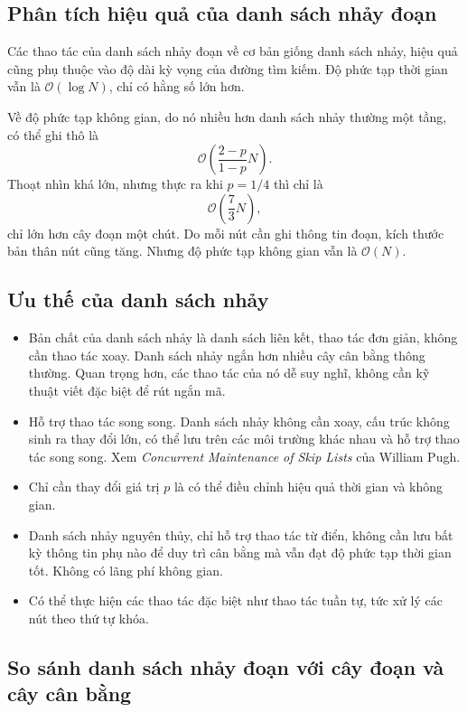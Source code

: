 \documentclass[11pt]{article}
\newcommand{\Oh}{\mathcal{O}}
\begin{document}
\subsection{Phân tích hiệu quả của danh sách nhảy đoạn}

Các thao tác của danh sách nhảy đoạn về cơ bản giống danh sách nhảy, hiệu quả
cũng phụ thuộc vào độ dài kỳ vọng của đường tìm kiếm. Độ phức tạp thời gian
vẫn là $\Oh(\log N)$, chỉ có hằng số lớn hơn.

Về độ phức tạp không gian, do nó nhiều hơn danh sách nhảy thường một tầng, có
thể ghi thô là
\[
  \Oh\!\left(\frac{2-p}{1-p}N\right).
\]
Thoạt nhìn khá lớn, nhưng thực ra khi $p=1/4$ thì chỉ là
\[
  \Oh\!\left(\frac{7}{3}N\right),
\]
chỉ lớn hơn cây đoạn một chút. Do mỗi nút cần ghi thông tin đoạn, kích thước
bản thân nút cũng tăng. Nhưng độ phức tạp không gian vẫn là $\Oh(N)$.

\subsection{Ưu thế của danh sách nhảy}

\begin{itemize}
  \item Bản chất của danh sách nhảy là danh sách liên kết, thao tác đơn giản,
  không cần thao tác xoay. Danh sách nhảy ngắn hơn nhiều cây cân bằng thông
  thường. Quan trọng hơn, các thao tác của nó dễ suy nghĩ, không cần kỹ thuật
  viết đặc biệt để rút ngắn mã.

  \item Hỗ trợ thao tác song song. Danh sách nhảy không cần xoay, cấu trúc
  không sinh ra thay đổi lớn, có thể lưu trên các môi trường khác nhau và hỗ
  trợ thao tác song song. Xem \textit{Concurrent Maintenance of Skip Lists}
  của William Pugh.

  \item Chỉ cần thay đổi giá trị $p$ là có thể điều chỉnh hiệu quả thời gian
  và không gian.

  \item Danh sách nhảy nguyên thủy, chỉ hỗ trợ thao tác từ điển, không cần lưu
  bất kỳ thông tin phụ nào để duy trì cân bằng mà vẫn đạt độ phức tạp thời
  gian tốt. Không có lãng phí không gian.

  \item Có thể thực hiện các thao tác đặc biệt như thao tác tuần tự, tức xử lý
  các nút theo thứ tự khóa.
\end{itemize}

\subsection{So sánh danh sách nhảy đoạn với cây đoạn và cây cân bằng}
\end{document}
